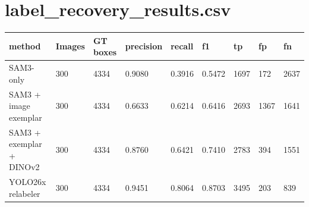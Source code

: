 \documentclass{article}
\begin{document}
\section*{label\_recovery\_results.csv}
\begin{lrbox}{\resulttable}\begin{tabular}{lllllllll}
\toprule
method & Images & GT boxes & precision & recall & f1 & tp & fp & fn \\
\midrule
SAM3-only & 300 & 4334 & 0.9080 & 0.3916 & 0.5472 & 1697 & 172 & 2637 \\
SAM3 + image exemplar & 300 & 4334 & 0.6633 & 0.6214 & 0.6416 & 2693 & 1367 & 1641 \\
SAM3 + exemplar + DINOv2 & 300 & 4334 & 0.8760 & 0.6421 & 0.7410 & 2783 & 394 & 1551 \\
YOLO26x relabeler & 300 & 4334 & 0.9451 & 0.8064 & 0.8703 & 3495 & 203 & 839 \\
\bottomrule
\end{tabular}\end{lrbox}
\noindent\ifdim\wd\resulttable>\linewidth\resizebox{.99\linewidth}{!}{\usebox{\resulttable}}\else\usebox{\resulttable}\fi
\clearpage
\end{document}
